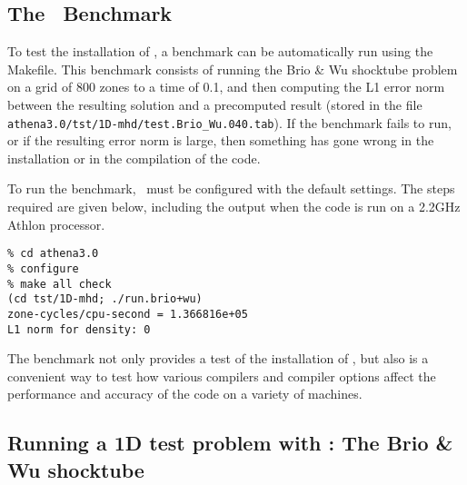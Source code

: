 \subsection{The \ath\ Benchmark}

To test the installation of \ath, a benchmark can be automatically
run using the Makefile.  This benchmark consists of running the Brio
\& Wu shocktube problem on a grid of 800 zones to a time of 0.1, and
then computing the L1 error norm between the resulting solution and a
precomputed result (stored in the file {\tt
athena3.0/tst/1D-mhd/test.Brio\_Wu.040.tab}).  If the benchmark fails
to run, or if the resulting error norm is large, then something has
gone wrong in the installation or in the compilation of the code.

To run the benchmark, \ath\ must be configured with the default settings.
The steps required are given below, including the output when the code
is run on a 2.2GHz Athlon processor.
\footnotesize
\begin{verbatim}
% cd athena3.0
% configure
% make all check
(cd tst/1D-mhd; ./run.brio+wu)
zone-cycles/cpu-second = 1.366816e+05
L1 norm for density: 0
\end{verbatim}
\normalsize
The benchmark not only provides a test of the installation of \ath, but also
is a convenient way to test how various compilers 
and compiler options affect the performance and accuracy of the code on
a variety of machines.

\subsection{Running a 1D test problem with \ath: The Brio \& Wu shocktube}

